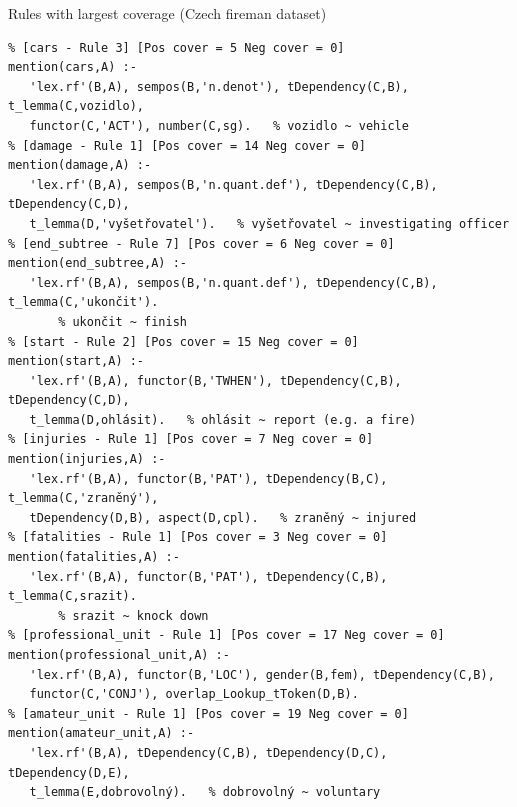 \documentclass[xcolor=dvipsnames]{beamer}
\begin{document}
\begin{frame}[fragile]{Rules with largest coverage (Czech fireman dataset)}
\begin{verbatim}
% [cars - Rule 3] [Pos cover = 5 Neg cover = 0]
mention(cars,A) :-
   'lex.rf'(B,A), sempos(B,'n.denot'), tDependency(C,B), t_lemma(C,vozidlo), 
   functor(C,'ACT'), number(C,sg).   % vozidlo ~ vehicle
% [damage - Rule 1] [Pos cover = 14 Neg cover = 0]
mention(damage,A) :-
   'lex.rf'(B,A), sempos(B,'n.quant.def'), tDependency(C,B), tDependency(C,D), 
   t_lemma(D,'vyšetřovatel').   % vyšetřovatel ~ investigating officer
% [end_subtree - Rule 7] [Pos cover = 6 Neg cover = 0]
mention(end_subtree,A) :-
   'lex.rf'(B,A), sempos(B,'n.quant.def'), tDependency(C,B), t_lemma(C,'ukončit').
       % ukončit ~ finish
% [start - Rule 2] [Pos cover = 15 Neg cover = 0]
mention(start,A) :-
   'lex.rf'(B,A), functor(B,'TWHEN'), tDependency(C,B), tDependency(C,D), 
   t_lemma(D,ohlásit).   % ohlásit ~ report (e.g. a fire)
% [injuries - Rule 1] [Pos cover = 7 Neg cover = 0]
mention(injuries,A) :-
   'lex.rf'(B,A), functor(B,'PAT'), tDependency(B,C), t_lemma(C,'zraněný'), 
   tDependency(D,B), aspect(D,cpl).   % zraněný ~ injured
% [fatalities - Rule 1] [Pos cover = 3 Neg cover = 0]
mention(fatalities,A) :-
   'lex.rf'(B,A), functor(B,'PAT'), tDependency(C,B), t_lemma(C,srazit).
       % srazit ~ knock down
% [professional_unit - Rule 1] [Pos cover = 17 Neg cover = 0]
mention(professional_unit,A) :-
   'lex.rf'(B,A), functor(B,'LOC'), gender(B,fem), tDependency(C,B), 
   functor(C,'CONJ'), overlap_Lookup_tToken(D,B).
% [amateur_unit - Rule 1] [Pos cover = 19 Neg cover = 0]
mention(amateur_unit,A) :-
   'lex.rf'(B,A), tDependency(C,B), tDependency(D,C), tDependency(D,E), 
   t_lemma(E,dobrovolný).   % dobrovolný ~ voluntary
\end{verbatim}
\end{frame}
\end{document}
